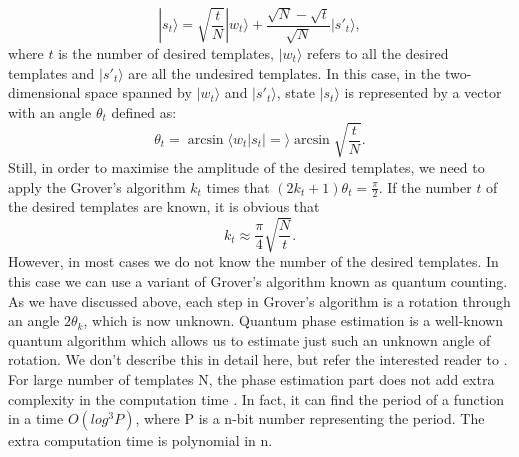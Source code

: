 \documentclass[aps,prd,nofootinbib,twocolumn,reprint,superscriptaddress,showpacs,showkeys,longbibliography]{revtex4-1}
\newcommand{\ket}[1]{|#1\rangle}
\newcommand{\braket}[2]{\langle #1|#2\rangle}
\begin{document}
\begin{equation}
    \label{som}
    \ket{s_t}=\sqrt{\frac{t}{N}}\ket{w_t}+\frac{\sqrt{N}-\sqrt{t}}{\sqrt{N}}\ket{s'_t},
\end{equation}
where $t$ is the number of desired templates, $\ket{w_t}$ refers to all the desired templates and $\ket{s'_t}$ are all the undesired templates. In this case, in the two-dimensional space spanned by $\ket{w_t}$ and $\ket{s'_t}$, state $\ket{s_t}$ is represented by a vector with an angle $\theta_t$ defined as:
\begin{equation}
\label{thetat}
   \theta_t=\arcsin\braket{w_t|s_t}=\arcsin {\sqrt{\frac{t}{N}}}. 
\end{equation}
Still, in order to maximise the amplitude of the desired templates, we need to apply the Grover's algorithm $k_t$ times that $(2k_t+1)\theta_t=\frac{\pi}{2}$. If the number $t$ of the desired templates are known, it is obvious that
\begin{equation}
\label{kt}
    k_t\approx\frac{\pi}{4}\sqrt{\frac{N}{t}}.
\end{equation}
However, in most cases we do not know the number of the desired templates. In this case we can use a variant of Grover's algorithm known as quantum counting\cite{brassard1998quantum}. As we have discussed above, each step in Grover's algorithm is a rotation through an angle $2 \theta_k$, which is now unknown. Quantum phase estimation is a well-known quantum algorithm which allows us to estimate just such an unknown angle of rotation. We don't describe this in detail here, but refer the interested reader to \cite{nielsen2002quantum}. For large number of templates N, the phase estimation part does not add extra complexity in the computation time \cite{brassard1998quantum}. In fact, it can find the period of a function in a time $O(log^3P)$, where P is a n-bit number representing the period. The extra computation time is polynomial in n.\cite{barnett2009quantum}
\end{document}

